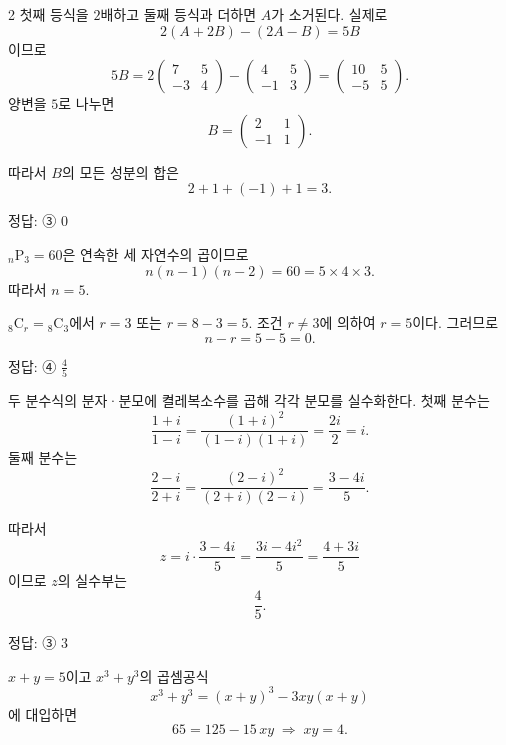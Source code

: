 \documentclass[10pt]{article}
\begin{document}
\begin{multicols}{2}
첫째 등식을 $2$배하고 둘째 등식과 더하면 $A$가 소거된다. 실제로
\[ 2(A + 2B) - (2A - B) = 5B \]
이므로
\[ 5B = 2\begin{pmatrix} 7 & 5 \\ -3 & 4 \end{pmatrix} - \begin{pmatrix} 4 & 5 \\ -1 & 3 \end{pmatrix} = \begin{pmatrix} 10 & 5 \\ -5 & 5 \end{pmatrix}. \]
양변을 $5$로 나누면
\[ B = \begin{pmatrix} 2 & 1 \\ -1 & 1 \end{pmatrix}. \]

따라서 $B$의 모든 성분의 합은
\[ 2 + 1 + (-1) + 1 = 3. \]

\begin{answerbox}정답: ③ $0$\end{answerbox}

${}_n\mathrm{P}_3 = 60$은 연속한 세 자연수의 곱이므로
\[ n(n - 1)(n - 2) = 60 = 5 \times 4 \times 3. \]
따라서 $n = 5$.

${}_8\mathrm{C}_r = {}_8\mathrm{C}_3$에서 $r = 3$ 또는 $r = 8 - 3 = 5$. 조건 $r \ne 3$에 의하여 $r = 5$이다. 그러므로
\[ n - r = 5 - 5 = 0. \]

\begin{answerbox}정답: ④ $\tfrac{4}{5}$\end{answerbox}

두 분수식의 분자·분모에 켤레복소수를 곱해 각각 분모를 실수화한다. 첫째 분수는
\[ \frac{1 + i}{1 - i} = \frac{(1 + i)^2}{(1 - i)(1 + i)} = \frac{2i}{2} = i. \]
둘째 분수는
\[ \frac{2 - i}{2 + i} = \frac{(2 - i)^2}{(2 + i)(2 - i)} = \frac{3 - 4i}{5}. \]

따라서
\[ z = i \cdot \frac{3 - 4i}{5} = \frac{3i - 4i^2}{5} = \frac{4 + 3i}{5} \]
이므로 $z$의 실수부는
\[ \frac{4}{5}. \]

\begin{answerbox}정답: ③ $3$\end{answerbox}

$x + y = 5$이고 $x^3 + y^3$의 곱셈공식
\[ x^3 + y^3 = (x + y)^3 - 3xy(x + y) \]
에 대입하면
\[ 65 = 125 - 15\, xy \;\Rightarrow\; xy = 4. \]


\end{multicols}
\end{document}
